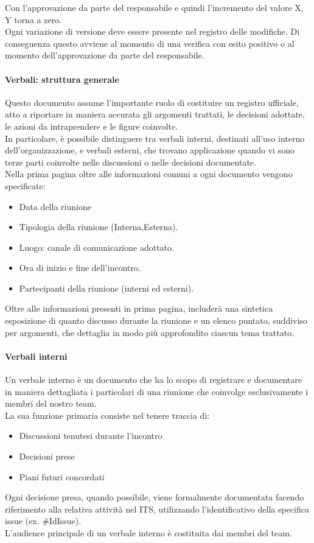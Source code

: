 \documentclass{article}
\begin{document}
Con l'approvazione da parte del responsabile e quindi l'incremento del valore X, Y torna a zero.\\
Ogni variazione di versione deve essere presente nel registro delle modifiche.
Di conseguenza questo avviene al momento di una verifica con esito positivo o al momento dell'approvazione da parte del responsabile.

\paragraph{Verbali: struttura generale}
Questo documento assume l'importante ruolo di costituire un registro ufficiale, atto a riportare in maniera accurata gli argomenti trattati, le decisioni adottate, le azioni da intraprendere e le figure coinvolte.\\
In particolare, è possibile distinguere tra verbali interni, destinati all'uso interno dell'organizzazione, e verbali esterni, che trovano applicazione quando vi sono terze parti coinvolte nelle discussioni o nelle decisioni documentate.\\ 
Nella prima pagina oltre alle informazioni comuni a ogni documento vengono specificate:
\begin{itemize}
    \item Data della riunione
    \item Tipologia della riunione (Interna,Esterna).
    \item Luogo: canale di comunicazione adottato.
    \item Ora di inizio e fine dell'incontro.
    \item Partecipanti della riunione (interni ed esterni).
\end{itemize}
Oltre alle informazioni presenti in prima pagina, includerà una sintetica esposizione di quanto discusso durante la riunione e un elenco puntato, suddiviso per argomenti, che dettaglia in modo più approfondito ciascun tema trattato.
\paragraph{Verbali interni}\label{sec:verbali interni}
Un verbale interno è un documento che ha lo scopo di registrare e documentare in maniera dettagliata i particolari di una riunione che coinvolge esclusivamente i membri del nostro team.\\
La sua funzione primaria consiste nel tenere traccia di:
\begin{itemize}
    \item Discussioni tenutesi durante l'incontro
    \item Decisioni prese
    \item Piani futuri concordati 
\end{itemize}
Ogni decisione presa, quando possibile, viene formalmente documentata facendo riferimento alla relativa attività nel ITS, utilizzando l'identificativo della specifica issue (ex. \#IdIssue).\\
L'audience principale di un verbale interno è costituita dai membri del team.
\end{document}

